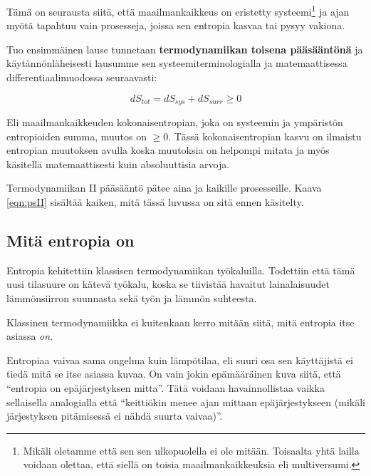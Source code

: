 \documentclass[12pt,a4paper,finnish]{book}
\begin{document}
Tämä on seurausta siitä, että maailmankaikkeus on eristetty systeemi\footnote{Mikäli oletamme että sen 
sen ulkopuolella ei ole mitään. Toisaalta yhtä lailla voidaan olettaa, että siellä on toisia maailmankaikkeuksia 
eli multiversumi.} ja ajan myötä tapahtuu vain prosesseja, joissa sen entropia kasvaa tai pysyy vakiona.

Tuo ensimmäinen lause tunnetaan \textbf{termodynamiikan toisena pääsääntönä} ja käytännönläheisesti 
lausumme sen systeemiterminologialla ja matemaattisessa differentiaalimuodossa seuraavasti:

\begin{equation}
\label{eqn:psII}
 dS_{tot} = dS_{sys} + dS_{surr} \geq 0
\end{equation}

Eli maailmankaikkeuden kokonaisentropian, joka on systeemin ja ympäristön entropioiden summa, muutos on $\geq 0$. 
Tässä kokonaisentropian kasvu on ilmaistu entropian muutoksen avulla koska muutoksia on helpompi mitata 
ja myös käsitellä matemaattisesti kuin absoluuttisia arvoja.

Termodynamiikan II pääsääntö pätee aina ja kaikille prosesseille. Kaava \ref{eqn:psII} sisältää kaiken, 
mitä tässä luvussa on sitä ennen käsitelty.


\subsection{Mitä entropia on}

Entropia kehitettiin klassisen termodynamiikan työkaluilla. Todettiin että tämä uusi tilasuure on kätevä 
työkalu, koska se tiivistää havaitut lainalaisuudet lämmönsiirron suunnasta sekä työn ja lämmön suhteesta.

Klassinen termodynamiikka 
ei kuitenkaan kerro mitään siitä, mitä entropia itse asiassa \textit{on}.

Entropiaa vaivaa sama ongelma kuin lämpötilaa, eli suuri osa sen käyttäjistä ei tiedä mitä se itse asiassa 
kuvaa. On vain jokin epämääräinen kuva siitä, että ``entropia on epäjärjestyksen mitta''. Tätä voidaan 
havainnollistaa vaikka sellaisella analogialla että ``keittiökin menee ajan mittaan epäjärjestykseen 
(mikäli järjestyksen pitämisessä ei nähdä suurta vaivaa)''. 
\end{document}
